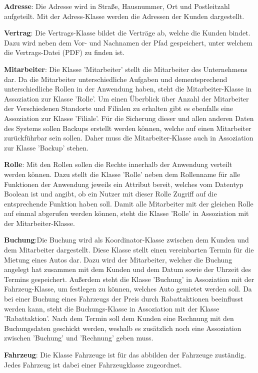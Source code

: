 \textbf{Adresse}: Die Adresse wird in Straße, Hausnummer, Ort und Postleitzahl aufgeteilt. Mit der Adress-Klasse werden die Adressen der Kunden dargestellt.

\textbf{Vertrag}: Die Vertrags-Klasse bildet die Verträge ab, welche die Kunden bindet. Dazu wird neben dem Vor- und Nachnamen der Pfad gespeichert, unter welchem die Vertrags-Datei (PDF) zu finden ist.

\textbf{Mitarbeiter}: Die Klasse 'Mitarbeiter' stellt die Mitarbeiter des Unternehmens dar. Da die Mitarbeiter unterschiedliche Aufgaben und dementsprechend unterschiedliche Rollen in der Anwendung haben, steht die Mitarbeiter-Klasse in Assoziation zur Klasse 'Rolle'. Um einen Überblick über Anzahl der Mitarbeiter der Verschiedenen Standorte und Filialen zu erhalten gibt es ebenfalls eine Assoziation zur Klasse 'Filiale'. Für die Sicherung dieser und allen anderen Daten des Systems sollen Backups erstellt werden können, welche auf einen Mitarbeiter zurückführbar sein sollen. Daher muss die Mitarbeiter-Klasse auch in Assoziation zur Klasse 'Backup' stehen.

\textbf{Rolle}: Mit den Rollen sollen die Rechte innerhalb der Anwendung verteilt werden können. Dazu stellt die Klasse 'Rolle' neben dem Rollenname für alle Funktionen der Anwendung jeweils ein Attribut bereit, welches vom Datentyp Boolean ist und angibt, ob ein Nutzer mit dieser Rolle Zugriff auf die entsprechende Funktion haben soll. Damit alle Mitarbeiter mit der gleichen Rolle auf einmal abgerufen werden können, steht die Klasse 'Rolle' in Assoziation mit der Mitarbeiter-Klasse.

\textbf{Buchung}:Die Buchung wird als Koordinator-Klasse zwischen dem Kunden und dem Mitarbeiter dargestellt. Diese Klasse stellt einen vereinbarten Termin für die Mietung eines Autos dar. Dazu wird der Mitarbeiter, welcher die Buchung angelegt hat zusammen mit dem Kunden und dem Datum sowie der Uhrzeit des Termins gespeichert. Außerdem steht die Klasse 'Buchung' in Assoziation mit der Fahrzeug-Klasse, um festlegen zu können, welches Auto gemietet werden soll. Da bei einer Buchung eines Fahrzeugs der Preis durch Rabattaktionen beeinflusst werden kann, steht die Buchungs-Klasse in Assoziation mit der Klasse 'Rabattaktion'. Nach dem Termin soll dem Kunden eine Rechnung mit den Buchungsdaten geschickt werden, weshalb es zusätzlich noch eine Assoziation zwischen 'Buchung' und 'Rechnung' geben muss.

\textbf{Fahrzeug}: Die Klasse Fahrzeuge ist für das abbilden der Fahrzeuge zuständig. Jedes Fahrzeug ist dabei einer Fahrzeugklasse zugeordnet.

